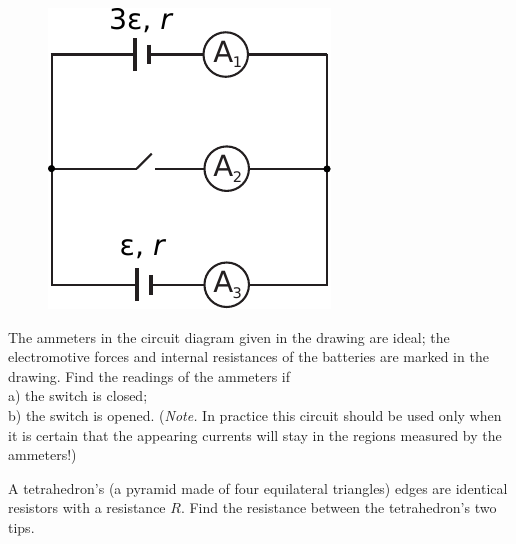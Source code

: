 \documentclass[11pt]{article}
\begin{document}

\probeng
\begin{figure}%
\vspace{-15pt}
\includegraphics[width=\linewidth]{2013-v2g-05-skeem}%
\end{figure}
The ammeters in the circuit diagram given in the drawing are ideal; the electromotive forces and internal resistances of the batteries are marked in the drawing. Find the readings of the ammeters if\\
a) the switch is closed;\\
b) the switch is opened. (\emph{Note.}  In practice this circuit should be used only when it is certain that the appearing currents will stay in the regions measured by the ammeters!)
\probend
\bigskip


\probeng
A tetrahedron’s (a pyramid made of four equilateral triangles) edges are identical resistors with a resistance $R$. Find the resistance between the tetrahedron’s two tips.
\probend
\bigskip
\end{document}
